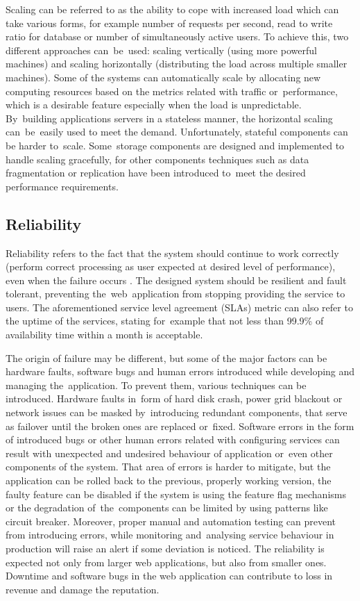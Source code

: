 Scaling can be referred to as the ability to cope with increased load which can take various forms, for example number of requests per second, read to write ratio for database or number of simultaneously active users. To achieve this, two different approaches can~be~used: scaling vertically (using more powerful machines) and scaling horizontally (distributing the load across multiple smaller machines). Some of the systems can automatically scale by allocating new computing resources based on the metrics related with traffic or~performance, which is a desirable feature especially when the load is unpredictable. By~building applications servers in a stateless manner, the horizontal scaling can~be~easily used to meet the demand. Unfortunately, stateful components can be harder to~scale. Some~storage components are designed and implemented to handle scaling gracefully, for other components techniques such as data fragmentation or replication have been introduced to~meet the desired performance requirements.

\subsection{Reliability}

Reliability refers to the fact that the system should continue to work correctly (perform correct processing as user expected at desired level of performance), even when the failure occurs \cite{DesignDataIntensiveApplications}. The designed system should be resilient and fault tolerant, preventing the~web~application from stopping providing the service to users. The aforementioned service level agreement (SLAs) metric can also refer to the uptime of the services, stating for~example that not less than 99.9\% of availability time within a month is acceptable.


The origin of failure may be different, but some of the major factors can be hardware faults, software bugs and human errors introduced while developing and managing the~application. To prevent them, various techniques can be introduced. Hardware faults in~form of hard disk crash, power grid blackout or network issues can be masked by~introducing redundant components, that serve as failover until the broken ones are replaced or~fixed. Software errors in the form of introduced bugs or other human errors related with configuring services can result with unexpected and undesired behaviour of application or~even other components of the system. That area of errors is harder to mitigate, but the application can be rolled back to the previous, properly working version, the faulty feature can be disabled if the system is using the feature flag mechanisms or the degradation of~the~components can be limited by using patterns like circuit breaker. Moreover, proper manual and automation testing can prevent from introducing errors, while monitoring and~analysing service behaviour in production will raise an alert if some deviation is noticed. 
The reliability is expected not only from larger web applications, but also from smaller ones. Downtime and software bugs in the web application can contribute to loss in revenue and damage the reputation.


